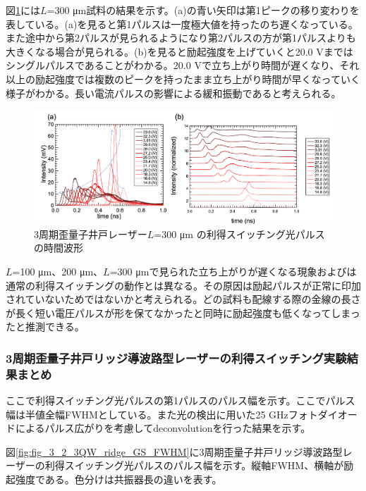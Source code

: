 {図\ref{fig:fig_3_2_3QW_ridge_L300_GS}には$L$=300 \si{\micro\metre}試料の結果を示す。(a)の青い矢印は第1ピークの移り変わりを表している。(a)を見ると第1パルスは一度極大値を持ったのち遅くなっている。また途中から第2パルスが見られるようになり第2パルスの方が第1パルスよりも大きくなる場合が見られる。(b)を見ると励起強度を上げていくと20.0 Vまではシングルパルスであることがわかる。20.0 Vで立ち上がり時間が遅くなり、それ以上の励起強度では複数のピークを持ったまま立ち上がり時間が早くなっていく様子がわかる。長い電流パルスの影響による緩和振動であると考えられる。
\begin{figure}[h]
	\centering
	\includegraphics[width=15cm]{figure/fig_3_2_3QW_ridge_L300_GS.png}
		\caption{3周期歪量子井戸レーザー$ L$=300 \si{\micro\metre} の利得スイッチング光パルスの時間波形}
		\label{fig:fig_3_2_3QW_ridge_L300_GS}
\end{figure}


$L$=100 \si{\micro\metre}、200 \si{\micro\metre}、$L$=300 \si{\micro\metre}で見られた立ち上がりが遅くなる現象およびは通常の利得スイッチングの動作とは異なる。その原因は励起パルスが正常に印加されていないためではないかと考えられる。どの試料も配線する際の金線の長さが長く短い電圧パルスが形を保てなかったと同時に励起強度も低くなってしまったと推測できる。
\subsubsection{3周期歪量子井戸リッジ導波路型レーザーの利得スイッチング実験結果まとめ}
ここで利得スイッチング光パルスの第1パルスのパルス幅を示す。ここでパルス幅は半値全幅FWHMとしている。また光の検出に用いた25 GHzフォトダイオードによるパルス広がりを考慮してdeconvolutionを行った結果を示す。

図\ref{fig:fig_3_2_3QW_ridge_GS_FWHM}に3周期歪量子井戸リッジ導波路型レーザーの利得スイッチング光パルスのパルス幅を示す。縦軸FWHM、横軸が励起強度である。色分けは共振器長の違いを表す。

}
